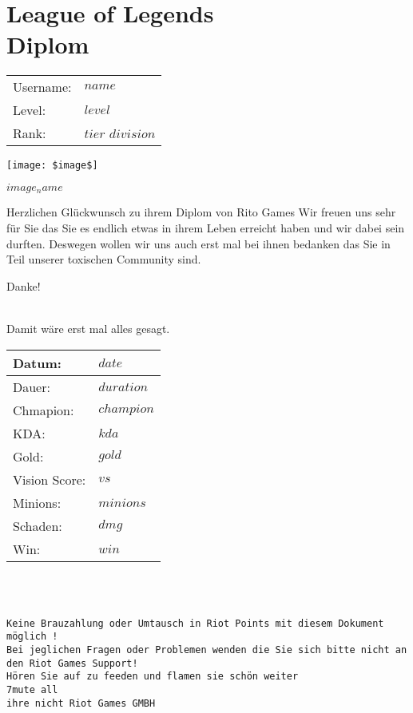 \documentclass[12pt,a4paper]{article}
\begin{document}
\part*{\center\textbf{League of Legends\\ Diplom}}

\begin{multicols}{2}
\begin{tabular}{ll}
Username: & $name$ \\
Level: & $level$ \\
Rank: & $tier$ $division$ \\
\end{tabular}
\columnbreak

\texttt{[image: \$image\$]}

\textbf{$image_name$}\\
\end{multicols}
\bigskip
\begin{center}
Herzlichen Glückwunsch zu ihrem Diplom von Rito Games
Wir freuen uns sehr für Sie das Sie es endlich etwas in ihrem Leben
erreicht haben und wir dabei sein durften.
Deswegen wollen wir uns auch erst mal bei ihnen bedanken das Sie
in Teil unserer toxischen Community sind.
\\
\begin{huge}
Danke!
\end{huge}
\\
Damit wäre erst mal alles gesagt.
\end{center}
\begin{tabular}{|l|l|}
\hline
Datum: & $date$\\
\hline
Dauer: & $duration$ \\
\hline
Chmapion: & $champion$\\
\hline
KDA: & $kda$\\
\hline
Gold: & $gold$ \\
\hline
Vision Score: & $vs$\\
\hline
Minions: & $minions$\\
\hline
Schaden: & $dmg$\\
\hline
Win: & $win$\\
\hline
\end{tabular}\\
\bigskip\\
\begin{center}
\tiny\texttt{Keine Brauzahlung oder Umtausch in Riot Points mit diesem Dokument möglich !\\
Bei jeglichen Fragen oder Problemen wenden die Sie sich bitte nicht an den Riot Games Support!\\
Hören Sie auf zu feeden und flamen sie schön weiter\\7mute all\\ihre nicht Riot Games GMBH}
\end{center}
\end{document}
